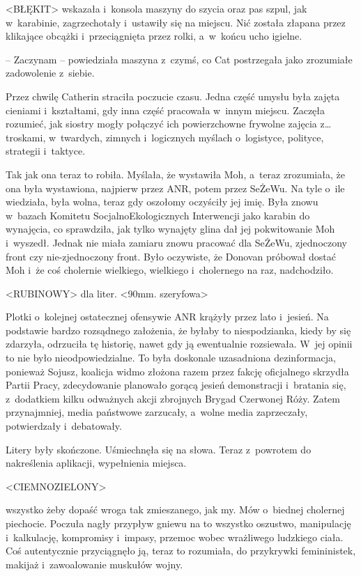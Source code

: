 \documentclass[oneside,polish,11pt,sfheadings]{mwbk}
\begin{document}
\textless{}BŁĘKIT\textgreater{} wskazała i~konsola maszyny do szycia
oraz pas szpul, jak w~karabinie, zagrzechotały i~ustawiły się na
miejscu. Nić została złapana przez klikające obcążki i~przeciągnięta
przez rolki, a~w~końcu ucho igielne. 

-- Zaczynam -- powiedziała maszyna z~czymś, co Cat postrzegała jako zrozumiałe zadowolenie z~siebie.

Przez chwilę Catherin straciła poczucie czasu. Jedna część umysłu była
zajęta cieniami i~kształtami, gdy inna część pracowała w~innym miejscu.
Zaczęła rozumieć, jak siostry mogły połączyć ich powierzchowne frywolne
zajęcia z\ldots troskami, w~twardych, zimnych i~logicznych myślach o~logistyce, polityce, strategii i~taktyce.

Tak jak ona teraz to robiła. Myślała, że wystawiła Moh, a~teraz
zrozumiała, że ona była wystawiona, najpierw przez ANR, potem przez
SeŻeWu. Na tyle o~ile wiedziała, była wolna, teraz gdy oszołomy
oczyściły jej imię. Była znowu w~bazach Komitetu Socjalno\dywiz Ekologicznych
Interwencji jako karabin do wynajęcia, co sprawdziła, jak tylko wynajęty
glina dał jej pokwitowanie Moh i~wyszedł. Jednak nie miała zamiaru znowu
pracować dla SeŻeWu, zjednoczony front czy nie-zjednoczony front. Było
oczywiste, że Donovan próbował dostać Moh i~że coś cholernie wielkiego,
wielkiego i~cholernego na raz, nadchodziło.

\textless{}RUBINOWY\textgreater{} dla liter. \textless{}90mm.
szeryfowa\textgreater{}

Plotki o~kolejnej ostatecznej ofensywie ANR krążyły przez lato i~jesień.
Na podstawie bardzo rozsądnego założenia, że byłaby to niespodzianka,
kiedy by się zdarzyła, odrzuciła tę historię, nawet gdy ją ewentualnie
rozsiewała. W~jej opinii to nie było nieodpowiedzialne. To była
doskonale uzasadniona dezinformacja, ponieważ Sojusz, koalicja widmo
złożona razem przez fakcję oficjalnego skrzydła Partii Pracy,
zdecydowanie planowało gorącą jesień demonstracji i~bratania się, z~dodatkiem kilku odważnych akcji zbrojnych Brygad Czerwonej Róży. Zatem
przynajmniej, media państwowe zarzucały, a~wolne media zaprzeczały,
potwierdzały i~debatowały.

Litery były skończone. Uśmiechnęła się na słowa. Teraz z~powrotem do
nakreślenia aplikacji, wypełnienia miejsca.

\textless{}CIEMNOZIELONY\textgreater{}

wszyst\-ko żeby dopaść wroga tak zmieszanego, jak my. Mów o~biednej
cholernej piechocie. Poczuła nagły przypływ gniewu na to wszyst\-ko
oszustwo, manipulację i~kalkulację, kompromisy i~impasy, przemoc wobec
wrażliwego ludzkiego ciała. Coś autentycznie przyciągnęło ją, teraz to
rozumiała, do przykrywki femininistek, makijaż i~zawoalowanie muskułów
wojny.
\end{document}
